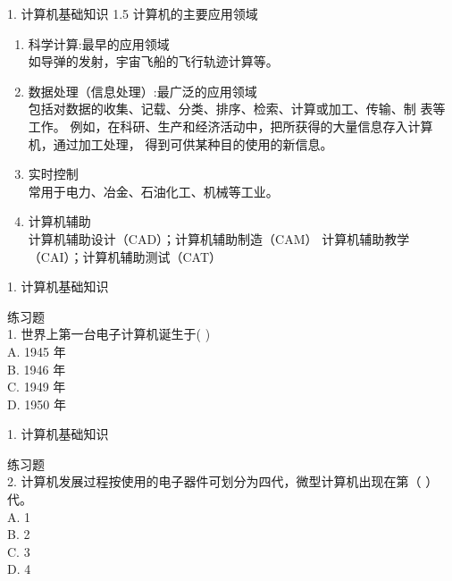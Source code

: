 \documentclass[aspectratio=169]{beamer}
\begin{document}
\begin{frame}[t]{1. 计算机基础知识} \vspace{20pt}
    1.5 计算机的主要应用领域

    \begin{enumerate}
        \item{科学计算:最早的应用领域}\\ 如导弹的发射，宇宙飞船的飞行轨迹计算等。
        \item{数据处理（信息处理）:最广泛的应用领域} 
            \\包括对数据的收集、记载、分类、排序、检索、计算或加工、传输、制 表等工作。
            例如，在科研、生产和经济活动中，把所获得的大量信息存入计算机，通过加工处理，
            得到可供某种目的使用的新信息。
        \item{实时控制}\\ 常用于电力、冶金、石油化工、机械等工业。
        \item{计算机辅助} \\ 计算机辅助设计（CAD）；计算机辅助制造（CAM）
            计算机辅助教学（CAI）；计算机辅助测试（CAT）
    \end{enumerate}

\end{frame}

\begin{frame}[t]{1. 计算机基础知识} \vspace{20pt}

    练习题\\
        1. 世界上第一台电子计算机诞生于(    )\\
            A. 1945 年\\
            B. 1946 年\\
            C. 1949 年\\
            D. 1950 年\\

\end{frame}

\begin{frame}[t]{1. 计算机基础知识} \vspace{20pt}

    练习题\\
            2. 计算机发展过程按使用的电子器件可划分为四代，微型计算机出现在第（ ）代。\\
            A. 1\\
            B. 2\\
            C. 3\\
            D. 4\\
\end{frame}
\end{document}
